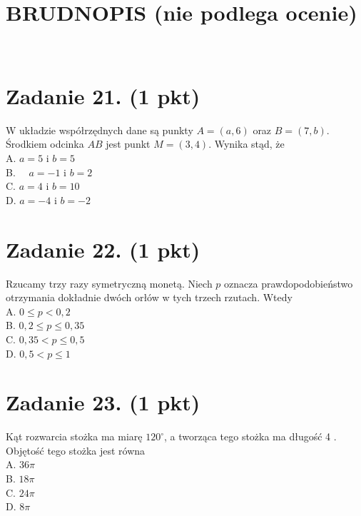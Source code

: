 \documentclass[10pt]{article}
\begin{document}
\section*{BRUDNOPIS (nie podlega ocenie)}
\(\qquad\)

\section*{Zadanie 21. (1 pkt)}
W układzie współrzędnych dane są punkty \(A=(a, 6)\) oraz \(B=(7, b)\). Środkiem odcinka \(A B\) jest punkt \(M=(3,4)\). Wynika stąd, że\\
A. \(a=5\) i \(b=5\)\\
B. \(\quad a=-1\) i \(b=2\)\\
C. \(a=4\) i \(b=10\)\\
D. \(a=-4\) i \(b=-2\)

\section*{Zadanie 22. (1 pkt)}
Rzucamy trzy razy symetryczną monetą. Niech \(p\) oznacza prawdopodobieństwo otrzymania dokładnie dwóch orłów w tych trzech rzutach. Wtedy\\
A. \(0 \leq p<0,2\)\\
B. \(0,2 \leq p \leq 0,35\)\\
C. \(0,35<p \leq 0,5\)\\
D. \(0,5<p \leq 1\)

\section*{Zadanie 23. (1 pkt)}
Kąt rozwarcia stożka ma miarę \(120^{\circ}\), a tworząca tego stożka ma długość 4 . Objętość tego stożka jest równa\\
A. \(36 \pi\)\\
B. \(18 \pi\)\\
C. \(24 \pi\)\\
D. \(8 \pi\)
\end{document}
